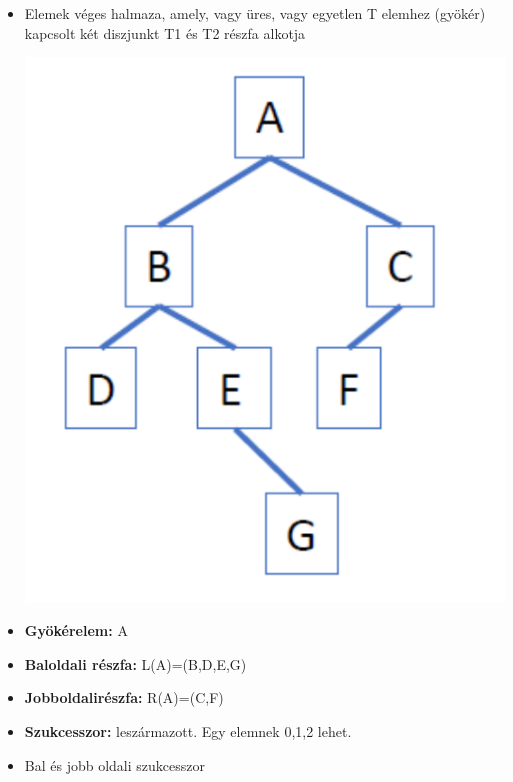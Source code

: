 \documentclass[11pt,a4paper]{article}
\begin{document}
            \begin{tcolorbox}[colback=blue!5!white,colframe=blue!50!black,title= 22. Ismertesse a bináris fák szerkezetét és tárolási lehetőségeit számítógépen!]
                \begin{itemize}
                    \item Elemek véges halmaza, amely, vagy üres, vagy egyetlen T elemhez (gyökér) kapcsolt két diszjunkt T1 és T2 részfa alkotja\\
                    \begin{center}
                        \includegraphics[scale = 0.3]{23_1.png}
                    \end{center}
                    \item \textbf{Gyökérelem:} A
                    \item \textbf{Baloldali részfa:} L(A)=(B,D,E,G)
                    \item \textbf{Jobboldalirészfa:} R(A)=(C,F)
                    \item \textbf{Szukcesszor:} leszármazott. Egy elemnek 0,1,2 lehet.
                    \item Bal és jobb oldali szukcesszor

\end{itemize}
\end{tcolorbox}
\end{document}
